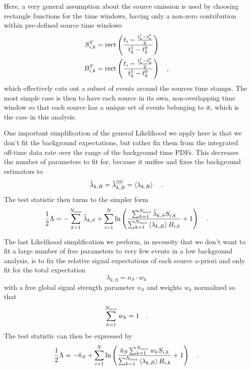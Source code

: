 Here, a very general assumption about the source emission is used by choosing rectangle functions for the time windows, having only a non-zero contribution within pre-defined source time windows
\begin{align}
  S_{i,k}^T &= \operatorname{rect}\left(\frac{t_i - \frac{t_k^1-t_k^0}{2}}
                              {t_k^1-t_k^0}\right) \\
  B_{i,k}^T &= \operatorname{rect}\left(\frac{t_i - \frac{t_k^1-t_k^0}{2}}
                              {t_k^1-t_k^0}\right)
  \quad\text{,}
\end{align}
which effectively cuts out a subset of events around the sources time stamps.
The most simple case is then to have each source in its own, non-overlapping time window so that each source has a unique set of events belonging to it, which is the case in this analysis.

One important simplification of the general Likelihood we apply here is that we don't fit the background expectations, but rather fix them from the integrated off-time data rate over the range of the background time PDFs.
This decreases the number of parameters to fit for, because it unifies and fixes the background estimators to
\begin{equation}
  \hat{\lambda}_{k,B} = \hat{\lambda}_{k,B}^{(0)} = \Braket{\lambda_{k,B}}
  \quad\text{.}
\end{equation}
The test statistic then turns to the simpler form
\begin{equation}
  \frac{1}{2}\Lambda
  = -\sum_{k=1}^{N_\text{srcs}}\hat{\lambda}_{k,S} +
    \sum_{i=1}^N \ln\left(
      \frac{\sum_{k=1}^{N_\text{srcs}}\hat{\lambda}_{k,S} S_{i,k}}
           {\sum_{k=1}^{N_\text{srcs}}\Braket{\lambda_{k,B}} B_{i,k}}
      + 1 \right)
  \quad\text{.}
\end{equation}

The last Likelihood simplification we perform, in necessity that we don't want to fit a large number of free parameters to very few events in a low background analysis, is to fix the relative signal expectations of each source a-priori and only fit for the total expectation
\begin{equation}
  \lambda_{k,S} = n_S \cdot w_k
\end{equation}
with a free global signal strength parameter $n_S$ and weights $w_k$ normalized so that
\begin{equation}
  \sum_{k=1}^{N_\text{srcs}} w_k = 1
  \quad\text{.}
\end{equation}
The test statistic can then be expressed by
\begin{equation}
  \frac{1}{2}\Lambda
  = -\hat{n}_S +
    \sum_{i=1}^N \ln\left(
      \frac{\hat{n}_S \sum_{k=1}^{N_\text{srcs}} w_k S_{i,k}}
           {\sum_{k=1}^{N_\text{srcs}}\Braket{\lambda_{k,B}} B_{i,k}}
      + 1 \right)
  \quad\text{.}
\end{equation}

